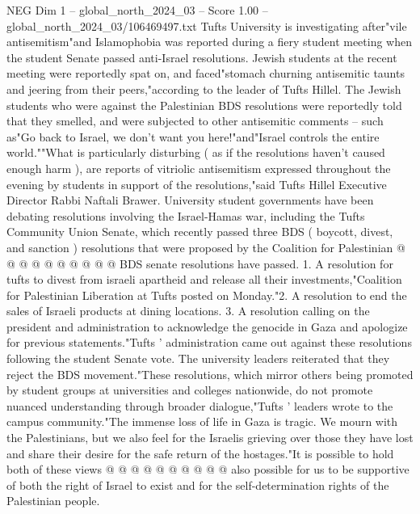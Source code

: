 \begin{textsample}{NEG Dim 1 – global\_north\_2024\_03 – Score 1.00 – global\_north\_2024\_03/106469497.txt}  \label{ex:f1_neg_396}
Tufts University is investigating after"vile antisemitism"and Islamophobia was reported during a fiery student meeting when the student Senate passed anti-Israel resolutions.
Jewish students at the recent meeting were reportedly spat on, and faced"stomach churning antisemitic taunts and jeering from their peers,"according to the leader of Tufts Hillel.
The Jewish students who were against the Palestinian BDS resolutions were reportedly told that they smelled, and were subjected to other antisemitic comments -- such as"Go back to Israel, we don't want you here!"and"Israel controls the entire world.""What is particularly disturbing ( as if the resolutions haven't caused enough harm ), are reports of vitriolic antisemitism expressed throughout the evening by students in support of the resolutions,"said Tufts Hillel Executive Director Rabbi Naftali Brawer.
University student governments have been debating resolutions involving the Israel-Hamas war, including the Tufts Community Union Senate, which recently passed three BDS ( boycott, divest, and sanction ) resolutions that were proposed by the Coalition for Palestinian @ @ @ @ @ @ @ @ @ @ BDS senate resolutions have passed. 1.
A resolution for tufts to divest from israeli apartheid and release all their investments,"Coalition for Palestinian Liberation at Tufts posted on Monday."2.
A resolution to end the sales of Israeli products at dining locations. 3.
A resolution calling on the president and administration to acknowledge the genocide in Gaza and apologize for previous statements."Tufts ' administration came out against these resolutions following the student Senate vote.
The university leaders reiterated that they reject the BDS movement."These resolutions, which mirror others being promoted by student groups at universities and colleges nationwide, do not promote nuanced understanding through broader dialogue,"Tufts ' leaders wrote to the campus community."The immense loss of life in Gaza is tragic.
We mourn with the Palestinians, but we also feel for the Israelis grieving over those they have lost and share their desire for the safe return of the hostages."It is possible to hold both of these views @ @ @ @ @ @ @ @ @ @ also possible for us to be supportive of both the right of Israel to exist and for the self-determination rights of the Palestinian people.

\end{textsample}
